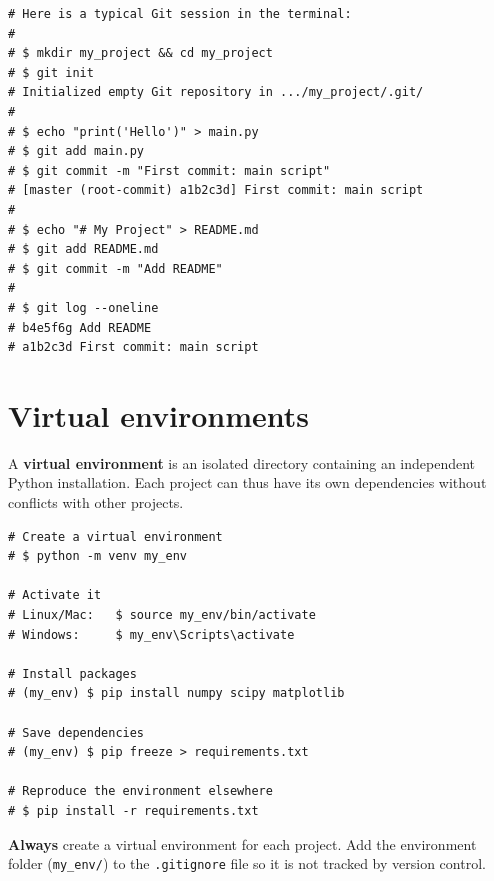 \begin{example}
\begin{codeblock}[title=\textbf{Python}]
\begin{verbatim}
# Here is a typical Git session in the terminal:
#
# $ mkdir my_project && cd my_project
# $ git init
# Initialized empty Git repository in .../my_project/.git/
#
# $ echo "print('Hello')" > main.py
# $ git add main.py
# $ git commit -m "First commit: main script"
# [master (root-commit) a1b2c3d] First commit: main script
#
# $ echo "# My Project" > README.md
# $ git add README.md
# $ git commit -m "Add README"
#
# $ git log --oneline
# b4e5f6g Add README
# a1b2c3d First commit: main script
\end{verbatim}
\end{codeblock}
\end{example}

\section{Virtual environments}

\begin{definition}
A \textbf{virtual environment} is an isolated directory containing an independent
Python installation. Each project can thus have its own dependencies without
conflicts with other projects.
\end{definition}

\begin{codeblock}[title=\textbf{Python}]
\begin{verbatim}
# Create a virtual environment
# $ python -m venv my_env

# Activate it
# Linux/Mac:   $ source my_env/bin/activate
# Windows:     $ my_env\Scripts\activate

# Install packages
# (my_env) $ pip install numpy scipy matplotlib

# Save dependencies
# (my_env) $ pip freeze > requirements.txt

# Reproduce the environment elsewhere
# $ pip install -r requirements.txt
\end{verbatim}
\end{codeblock}

\begin{bestpractice}
\textbf{Always} create a virtual environment for each project.
Add the environment folder (\texttt{my\_env/}) to the
\texttt{.gitignore} file so it is not tracked by version control.
\end{bestpractice}

